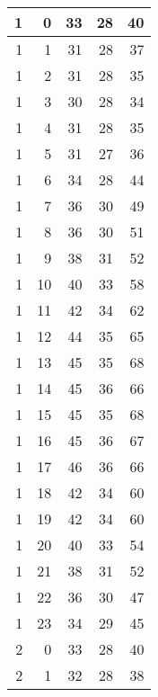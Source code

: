   
    \begin{longtable}{|r|r|r|r|r|}
		\hline
    1     & 0     & 33    & 28    & 40 \\
    \hline
    1     & 1     & 31    & 28    & 37 \\
    \hline
    1     & 2     & 31    & 28    & 35 \\
    \hline
    1     & 3     & 30    & 28    & 34 \\
    \hline
    1     & 4     & 31    & 28    & 35 \\
    \hline
    1     & 5     & 31    & 27    & 36 \\
    \hline
    1     & 6     & 34    & 28    & 44 \\
    \hline
    1     & 7     & 36    & 30    & 49 \\
    \hline
    1     & 8     & 36    & 30    & 51 \\
    \hline
    1     & 9     & 38    & 31    & 52 \\
    \hline
    1     & 10    & 40    & 33    & 58 \\
    \hline
    1     & 11    & 42    & 34    & 62 \\
    \hline
    1     & 12    & 44    & 35    & 65 \\
    \hline
    1     & 13    & 45    & 35    & 68 \\
    \hline
    1     & 14    & 45    & 36    & 66 \\
    \hline
    1     & 15    & 45    & 35    & 68 \\
    \hline
    1     & 16    & 45    & 36    & 67 \\
    \hline
    1     & 17    & 46    & 36    & 66 \\
    \hline
    1     & 18    & 42    & 34    & 60 \\
    \hline
    1     & 19    & 42    & 34    & 60 \\
    \hline
    1     & 20    & 40    & 33    & 54 \\
    \hline
    1     & 21    & 38    & 31    & 52 \\
    \hline
    1     & 22    & 36    & 30    & 47 \\
    \hline
    1     & 23    & 34    & 29    & 45 \\
    \hline
    2     & 0     & 33    & 28    & 40 \\
    \hline
    2     & 1     & 32    & 28    & 38 \\

\end{longtable}
